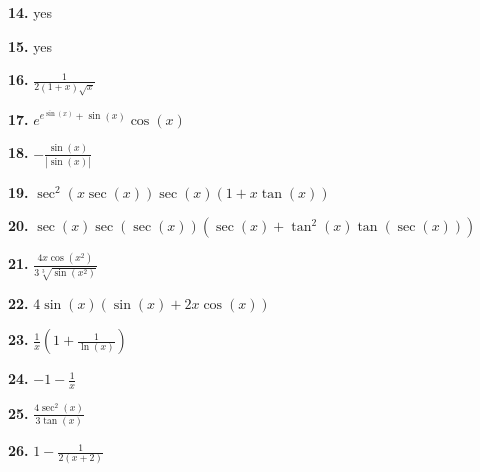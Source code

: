 \documentclass[12pt,]{book}
\theoremstyle{plain}
\theoremstyle{definition}
\numberwithin{equation}{section}
\newcommand{\fe}[2]{#1\mathopen{}\left(#2\right)\mathclose{}}
\newcommand{\abs}[1]{\left|#1\right|}
\begin{document}
                \par\smallskip
\noindent\textbf{14.}\quad{}
                    yes%

                \par\smallskip
\noindent\textbf{15.}\quad{}
                    yes%

                \par\smallskip
\noindent\textbf{16.}\quad{}
                    \(\frac{1}{2(1+x)\sqrt{x}}\)%

                \par\smallskip
\noindent\textbf{17.}\quad{}
                    \(e^{e^{\fe{\sin}{x}}+\fe{\sin}{x}}\fe{\cos}{x}\)%

                \par\smallskip
\noindent\textbf{18.}\quad{}
                    \(-\frac{\fe{\sin}{x}}{\abs{\fe{\sin}{x}}}\)%

                \par\smallskip
\noindent\textbf{19.}\quad{}
                    \(\fe{\sec^2}{x\fe{\sec}{x}}\fe{\sec}{x}\left(1+x\fe{\tan}{x}\right)\)%

                \par\smallskip
\noindent\textbf{20.}\quad{}
                    \(\fe{\sec}{x}\fe{\sec}{\fe{\sec}{x}}\left(\fe{\sec}{x}+\fe{\tan^2}{x}\fe{\tan}{\fe{\sec}{x}}\right)\)%

                \par\smallskip
\noindent\textbf{21.}\quad{}
                    \(\frac{4x\fe{\cos}{x^2}}{3\sqrt[3]{\fe{\sin}{x^2}}}\)%

                \par\smallskip
\noindent\textbf{22.}\quad{}
                    \(4\fe{\sin}{x}\left(\fe{\sin}{x}+2x\fe{\cos}{x}\right)\)%

                \par\smallskip
\noindent\textbf{23.}\quad{}
                    \(\frac{1}{x}\left(1+\frac{1}{\fe{\ln}{x}}\right)\)%

                \par\smallskip
\noindent\textbf{24.}\quad{}
                    \(-1-\frac{1}{x}\)%

                \par\smallskip
\noindent\textbf{25.}\quad{}
                    \(\frac{4\fe{\sec^2}{x}}{3\fe{\tan}{x}}\)%

                \par\smallskip
\noindent\textbf{26.}\quad{}
                    \(1-\frac{1}{2(x+2)}\)%
\end{document}
